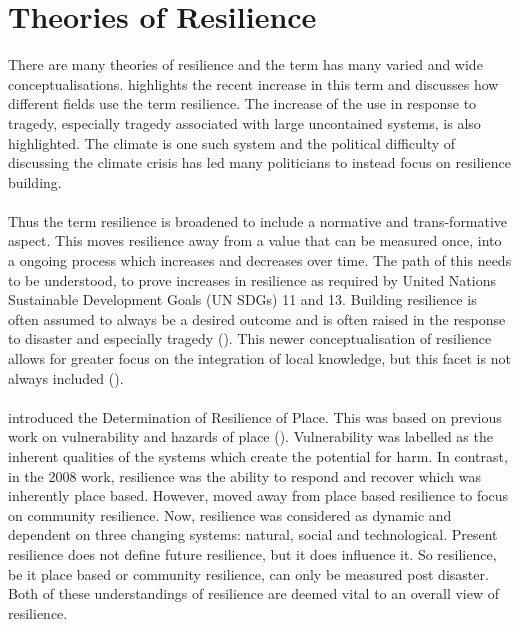 \section{Theories of Resilience }

There are many theories of resilience and the term has many varied and wide conceptualisations. \cite{moser_turbulent_2019} highlights the recent increase in this term and discusses how different fields use the term resilience.  The increase of the use in response to tragedy, especially tragedy associated with large uncontained systems, is also highlighted. The climate is one such system and the political difficulty of discussing the climate crisis has led many politicians to instead focus on resilience building. 
\paragraph{}

Thus the term resilience is broadened to include a normative and trans-formative aspect.  This moves resilience away from a value that can be measured once, into a ongoing process which increases and decreases over time. The path of this needs to be understood, to prove increases in resilience as required by United Nations Sustainable Development Goals (UN SDGs) 11 and 13. Building resilience is often assumed to always be a desired outcome and is often raised in the response to disaster and especially tragedy (\cite{moser_turbulent_2019}). This newer conceptualisation of resilience allows for greater focus on the integration of local knowledge, but this facet is not always included (\cite{moser_turbulent_2019}).
\paragraph{}


\cite{cutter_place-based_2008} introduced the Determination of Resilience of Place. This was based on previous work on vulnerability and hazards of place (\cite{cutter_vulnerability_1996}).  Vulnerability was labelled as the inherent qualities of the systems which create the potential for harm.
In contrast, in the 2008 work, resilience was the ability to respond and recover which was inherently place based. However, \cite{cutter_community_2020} moved away from place based resilience to focus on community resilience. Now, resilience was considered as dynamic and dependent on three changing systems: natural, social and technological. Present resilience does not define future resilience, but it does influence it. So resilience, be it place based or community resilience, can only be measured post disaster. Both of these understandings of resilience are deemed vital to an overall view of resilience.
